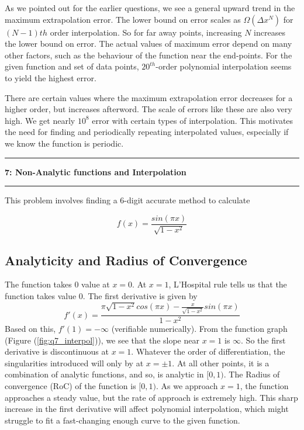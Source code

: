 \documentclass[11pt]{article}
\newcommand\question[2]{\vspace{.25in}\hrule\textbf{#1: #2}\vspace{.5em}\hrule\vspace{.10in}}
\begin{document}
As we pointed out for the earlier questions, we see a general upward trend in the maximum extrapolation error. The lower bound on error scales as $\Omega(\Delta x^{N})$ for $(N-1)th$ order interpolation. So for far away points, increasing $N$ increases the lower bound on error. The actual values of maximum error depend on many other factors, such as the behaviour of the function near the end-points. For the given function and set of data points, $20^{th}$-order polynomial interpolation seems to yield the highest error.

There are certain values where the maximum extrapolation error decreases for a higher order, but increases afterword. The scale of errors like these are also very high. We get nearly $10^{8}$ error with certain types of interpolation. This motivates the need for finding and periodically repeating interpolated values, especially if we know the function is periodic. 
    
\vspace{1.0em}    
    
\question{7}{Non-Analytic functions and Interpolation}    
\setcounter{section}{7}  
\setcounter{subsection}{0}

This problem involves finding a 6-digit accurate method to calculate

\begin{equation}
f(x) = \frac{sin(\pi x)}{\sqrt{1-x^2}}
\end{equation}
    
\subsection{Analyticity and Radius of Convergence}
    
The function takes 0 value at $x=0$. At $x=1$, L'Hospital rule tells us that the function takes value 0. The first derivative is given by
\begin{equation}
f'(x) = \frac{\pi \sqrt{1-x^2}cos(\pi x) - \frac{x}{\sqrt{1-x^2}} sin(\pi x)}{1-x^2}
\end{equation}
Based on this, $f'(1)=-\infty$ (verifiable numerically). From the function graph (Figure (\ref{fig:q7_interpol})), we see that the slope near $x=1$ is $\infty$. So the first derivative is discontinuous at $x=1$. Whatever the order of differentiation, the singularities introduced will only by at $x=\pm 1$. At all other points, it is a combination of analytic functions, and so, is analytic in $[0,1)$. The Radius of convergence (RoC) of the function is $[0,1)$. As we approach $x=1$, the function approaches a steady value, but the rate of approach is extremely high. This sharp increase in the first derivative will affect polynomial interpolation, which might  struggle to fit a fast-changing enough curve to the given function. 
\end{document}
